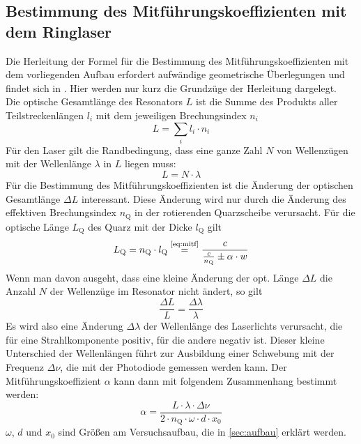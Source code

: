 \subsection{Bestimmung des Mitführungskoeffizienten mit dem Ringlaser}
Die Herleitung der Formel für die Bestimmung des Mitführungskoeffizienten mit dem vorliegenden Aufbau erfordert
aufwändige geometrische Überlegungen und findet sich in \cite{staatsex}.
Hier werden nur kurz die Grundzüge der Herleitung dargelegt.\\
Die optische Gesamtlänge des Resonators $L$ ist die Summe des Produkts aller Teilstreckenlängen $l_i$ mit dem 
jeweiligen Brechungsindex $n_i$
\begin{equation}
\label{}
L = \sum_i{l_i \cdot n_i}
\end{equation}
Für den Laser gilt die Randbedingung, dass eine ganze Zahl $N$ von Wellenzügen mit der Wellenlänge $\lambda$
in $L$ liegen muss:
\begin{equation}
\label{}
L = N \cdot \lambda
\end{equation}
Für die Bestimmung des Mitführungskoeffizienten ist die Änderung der optischen Gesamtlänge $\Delta L$ interessant.
Diese Änderung wird nur durch die Änderung des effektiven Brechungsindex $n_\text{Q}$
in der rotierenden Quarzscheibe
verursacht. Für die optische Länge $L_\text{Q}$ des Quarz mit der Dicke $l_\text{Q}$ gilt
\begin{equation}
\label{}
L_\text{Q} = n_\text{Q} \cdot l_\text{Q} \refeq{eq:mitf} \frac{c}{\frac{c}{n_\text{Q}} \pm \alpha \cdot w}
\end{equation}
Wenn man davon ausgeht, dass eine kleine Änderung der opt. Länge $\Delta L$ die Anzahl $N$ der Wellenzüge
im Resonator nicht ändert, so gilt
\begin{equation}
\label{}
\frac{\Delta L}{L} = \frac{\Delta \lambda}{\lambda}
\end{equation}
Es wird also eine Änderung $\Delta \lambda$ der Wellenlänge des Laserlichts verursacht,
die für eine Strahlkomponente positiv, für die andere negativ ist.
Dieser kleine Unterschied der Wellenlängen führt zur Ausbildung einer Schwebung mit der Frequenz
$\Delta \nu$, die mit der Photodiode gemessen werden kann.
Der Mitführungskoeffizient $\alpha$ kann dann mit folgendem Zusammenhang bestimmt werden:
\begin{equation}
\label{eq:alpha:exp}
\alpha = \frac{L \cdot \lambda \cdot \Delta \nu}{2 \cdot n_\text{Q} \cdot \omega \cdot d \cdot x_0}
\end{equation}
$\omega$, $d$ und $x_0$ sind Größen am Versuchsaufbau, die in \autoref{sec:aufbau} erklärt werden.


